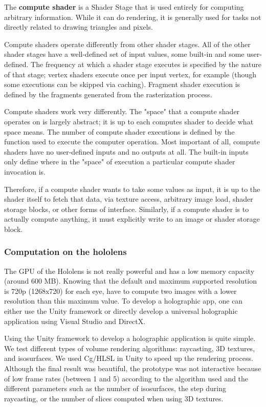 The \textbf{ compute shader} is a Shader Stage that is used entirely for computing arbitrary information. While it can do rendering, it is generally used for tasks not directly related to drawing triangles and pixels.

Compute shaders operate differently from other shader stages. All of the other shader stages have a well-defined set of input values, some built-in and some user-defined. The frequency at which a shader stage executes is specified by the nature of that stage; vertex shaders execute once per input vertex, for example (though some executions can be skipped via caching). Fragment shader execution is defined by the fragments generated from the rasterization process.

Compute shaders work very differently. The "space" that a compute shader operates on is largely abstract; it is up to each computes shader to decide what space means. The number of compute shader executions is defined by the function used to execute the computer operation. Most important of all, compute shaders have no user-defined inputs and no outputs at all. The built-in inputs only define where in the "space" of execution a particular compute shader invocation is.

Therefore, if a compute shader wants to take some values as input, it is up to the shader itself to fetch that data, via texture access, arbitrary image load, shader storage blocks, or other forms of interface. Similarly, if a compute shader is to actually compute anything, it must explicitly write to an image or shader storage block.

\subsubsection{Computation on the hololens}

The GPU of the Hololens is not really powerful and has a low memory capacity (around 600 MB).  Knowing that the default and maximum supported resolution is 720p (1268x720) for each eye, have to compute two images with a lower resolution than this maximum value.  To develop a holographic app, one can either use the Unity framework or directly develop a universal holographic application using Visual Studio and DirectX.


Using the Unity framework to develop a holographic application is quite simple. We test different types of volume rendering algorithms: raycasting, 3D textures, and isosurfaces.
We used Cg/HLSL in Unity to speed up the rendering process. Although the final result was beautiful, the prototype was not interactive because of low frame rates (between 1 and 5) according to the algorithm used and the different parameters such as the number of isosurfaces, the step during raycasting, or the number of slices computed when using 3D textures.


